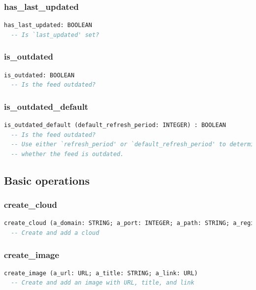 \subsubsection{has\_last\_updated}

\begin{lstlisting}[language=Eiffel]
has_last_updated: BOOLEAN
  -- Is `last_updated' set?
\end{lstlisting}

\subsubsection{is\_outdated}

\begin{lstlisting}[language=Eiffel]
is_outdated: BOOLEAN
  -- Is the feed outdated?
\end{lstlisting}

\subsubsection{is\_outdated\_default}

\begin{lstlisting}[language=Eiffel]
is_outdated_default (default_refresh_period: INTEGER) : BOOLEAN
  -- Is the feed outdated? 
  -- Use either `refresh_period' or `default_refresh_period' to determine
  -- whether the feed is outdated.
\end{lstlisting}


\subsection{Basic operations}
\label{sec:feed-basic-operations}

\subsubsection{create\_cloud}

\begin{lstlisting}[language=Eiffel]
create_cloud (a_domain: STRING; a_port: INTEGER; a_path: STRING; a_register_procedure: STRING; a_protocol: STRING)
  -- Create and add a cloud
\end{lstlisting}

\subsubsection{create\_image}

\begin{lstlisting}[language=Eiffel]
create_image (a_url: URL; a_title: STRING; a_link: URL)
  -- Create and add an image with URL, title, and link
\end{lstlisting}

